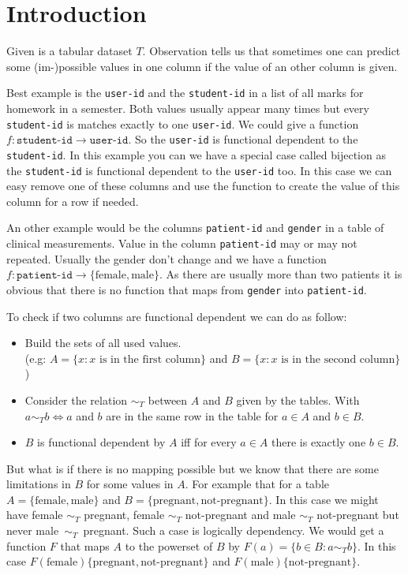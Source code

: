 \documentclass[a4paper]{article}
\begin{document}
\tableofcontents

\newpage
\section{Introduction}
Given is a tabular dataset $T$.
Observation tells us that sometimes one can predict some (im-)possible values in one column if the value of an other column is given.

Best example is the \texttt{user-id} and the \texttt{student-id} in a list of all marks for homework in a semester.
Both values usually appear many times but every \texttt{student-id} is matches exactly to one \texttt{user-id}.
We could give a function $f : \texttt{student-id} \to \texttt{user-id}$.
So the \texttt{user-id} is functional dependent to the \texttt{student-id}.
In this example you can we have a special case called bijection as the \texttt{student-id} is functional dependent to the \texttt{user-id} too.
In this case we can easy remove one of these columns and use the function to create the value of this column for a row if needed.

An other example would be the columns \texttt{patient-id} and \texttt{gender} in a table of clinical measurements. 
Value in the column \texttt{patient-id} may or may not repeated.
Usually the gender don't change and we have a function $f : \texttt{patient-id} \to \{ \mbox{female}, \mbox{male} \}$.
As there are usually more than two patients it is obvious that there is no function that maps from \texttt{gender} into \texttt{patient-id}. 

To check if two columns are functional dependent we can do as follow:
\begin{itemize}
\item Build the sets of all used values.\\ (e.g: $A = \{ x : x \mbox{ is in the first column} \}$ and $B = \{ x : x \mbox{ is in the second column} \}$)
\item Consider the relation $\sim_T$ between $A$ and $B$ given by the tables. With $a \sim_T b \Leftrightarrow a$ and $b$ are in the same row in the table for $a \in A$ and $b \in B$.
\item $B$ is functional dependent by $A$ iff for every $a \in A$ there is exactly one $b \in B$.
\end{itemize}

But what is if there is no mapping possible but we know that there are some limitations in $B$ for some values in $A$.
For example that for a table $A = \{ \mbox{female}, \mbox{male} \}$ and $B = \{ \mbox{pregnant}, \mbox{not-pregnant} \}$.
In this case we might have female $\sim_T$ pregnant, female $\sim_T$ not-pregnant and male $\sim_T$ not-pregnant but never \mbox{male $\sim_T$ pregnant}.
Such a case is logically dependency.
We would get a function $F$ that maps $A$ to the powerset of $B$ by $F(a) = \{ b \in B : a \sim_T b \}$. 
In this case $F(\mbox{female}) \{ \mbox{pregnant}, \mbox{not-pregnant} \}$ and $F(\mbox{male}) \{ \mbox{not-pregnant} \}$.
\end{document}
